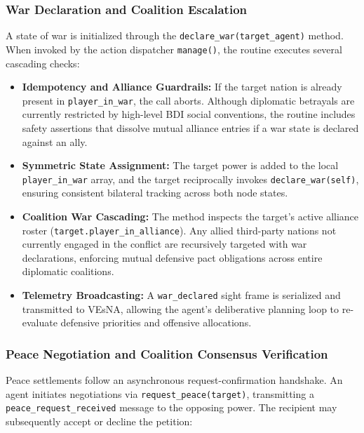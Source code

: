 \subsubsection{War Declaration and Coalition Escalation}
A state of war is initialized through the \texttt{declare\_war(target\_agent)} method. When invoked by the action dispatcher \texttt{manage()}, the routine executes several cascading checks:

\begin{itemize}
    \item \textbf{Idempotency and Alliance Guardrails:} If the target nation is already present in \texttt{player\_in\_war}, the call aborts. Although diplomatic betrayals are currently restricted by high-level BDI social conventions, the routine includes safety assertions that dissolve mutual alliance entries if a war state is declared against an ally.
    \item \textbf{Symmetric State Assignment:} The target power is added to the local \texttt{player\_in\_war} array, and the target reciprocally invokes \texttt{declare\_war(self)}, ensuring consistent bilateral tracking across both node states.
    \item \textbf{Coalition War Cascading:} The method inspects the target's active alliance roster (\texttt{target.player\_in\_alliance}). Any allied third-party nations not currently engaged in the conflict are recursively targeted with war declarations, enforcing mutual defensive pact obligations across entire diplomatic coalitions.
    \item \textbf{Telemetry Broadcasting:} A \texttt{war\_declared} sight frame is serialized and transmitted to VEsNA, allowing the agent's deliberative planning loop to re-evaluate defensive priorities and offensive allocations.
\end{itemize}

\subsubsection{Peace Negotiation and Coalition Consensus Verification}
Peace settlements follow an asynchronous request-confirmation handshake. An agent initiates negotiations via \texttt{request\_peace(target)}, transmitting a \texttt{peace\_request\_received} message to the opposing power. The recipient may subsequently accept or decline the petition:


